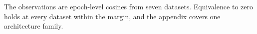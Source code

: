 The observations are epoch-level cosines from seven datasets. Equivalence to zero holds at
every dataset within the margin, and the appendix covers one architecture family.
